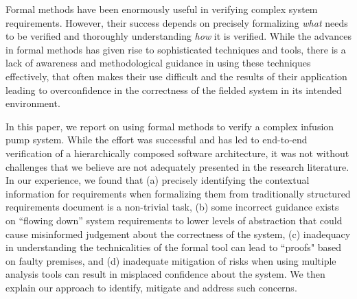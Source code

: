 Formal methods have been enormously useful in verifying complex system requirements. However, their success depends on precisely formalizing {\em what} needs to be verified and thoroughly understanding {\em how} it is verified. While the advances in formal methods has given rise to sophisticated techniques and tools, there is a lack of awareness and methodological guidance in using these techniques effectively, that often makes their use difficult and the results of their application leading to overconfidence in the correctness of the fielded system in its intended environment.

In this paper, we report on using formal methods to verify a complex infusion pump system.  While the effort was successful and has led to end-to-end verification of a hierarchically composed software architecture, it was not without challenges that we believe are not adequately presented in the research literature. In our experience, we found that (a) precisely identifying the contextual information for requirements when formalizing them from traditionally structured requirements document is a non-trivial task, (b) some incorrect guidance exists on ``flowing down'' system requirements to lower levels of abstraction that could cause misinformed judgement about the correctness of the system, (c) inadequacy in understanding the technicalities of the formal tool can lead to ``proofs" based on faulty premises, and (d) inadequate mitigation of risks when using multiple analysis tools can result in misplaced confidence about the system. We then explain our approach to identify, mitigate and address such concerns.
